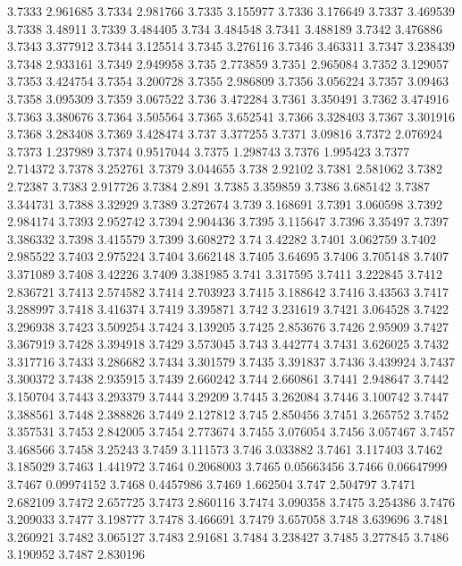 3.7333  2.961685
3.7334  2.981766
3.7335  3.155977
3.7336  3.176649
3.7337  3.469539
3.7338  3.48911
3.7339  3.484405
3.734  3.484548
3.7341  3.488189
3.7342  3.476886
3.7343  3.377912
3.7344  3.125514
3.7345  3.276116
3.7346  3.463311
3.7347  3.238439
3.7348  2.933161
3.7349  2.949958
3.735  2.773859
3.7351  2.965084
3.7352  3.129057
3.7353  3.424754
3.7354  3.200728
3.7355  2.986809
3.7356  3.056224
3.7357  3.09463
3.7358  3.095309
3.7359  3.067522
3.736  3.472284
3.7361  3.350491
3.7362  3.474916
3.7363  3.380676
3.7364  3.505564
3.7365  3.652541
3.7366  3.328403
3.7367  3.301916
3.7368  3.283408
3.7369  3.428474
3.737  3.377255
3.7371  3.09816
3.7372  2.076924
3.7373  1.237989
3.7374  0.9517044
3.7375  1.298743
3.7376  1.995423
3.7377  2.714372
3.7378  3.252761
3.7379  3.044655
3.738  2.92102
3.7381  2.581062
3.7382  2.72387
3.7383  2.917726
3.7384  2.891
3.7385  3.359859
3.7386  3.685142
3.7387  3.344731
3.7388  3.32929
3.7389  3.272674
3.739  3.168691
3.7391  3.060598
3.7392  2.984174
3.7393  2.952742
3.7394  2.904436
3.7395  3.115647
3.7396  3.35497
3.7397  3.386332
3.7398  3.415579
3.7399  3.608272
3.74  3.42282
3.7401  3.062759
3.7402  2.985522
3.7403  2.975224
3.7404  3.662148
3.7405  3.64695
3.7406  3.705148
3.7407  3.371089
3.7408  3.42226
3.7409  3.381985
3.741  3.317595
3.7411  3.222845
3.7412  2.836721
3.7413  2.574582
3.7414  2.703923
3.7415  3.188642
3.7416  3.43563
3.7417  3.288997
3.7418  3.416374
3.7419  3.395871
3.742  3.231619
3.7421  3.064528
3.7422  3.296938
3.7423  3.509254
3.7424  3.139205
3.7425  2.853676
3.7426  2.95909
3.7427  3.367919
3.7428  3.394918
3.7429  3.573045
3.743  3.442774
3.7431  3.626025
3.7432  3.317716
3.7433  3.286682
3.7434  3.301579
3.7435  3.391837
3.7436  3.439924
3.7437  3.300372
3.7438  2.935915
3.7439  2.660242
3.744  2.660861
3.7441  2.948647
3.7442  3.150704
3.7443  3.293379
3.7444  3.29209
3.7445  3.262084
3.7446  3.100742
3.7447  3.388561
3.7448  2.388826
3.7449  2.127812
3.745  2.850456
3.7451  3.265752
3.7452  3.357531
3.7453  2.842005
3.7454  2.773674
3.7455  3.076054
3.7456  3.057467
3.7457  3.468566
3.7458  3.25243
3.7459  3.111573
3.746  3.033882
3.7461  3.117403
3.7462  3.185029
3.7463  1.441972
3.7464  0.2068003
3.7465  0.05663456
3.7466  0.06647999
3.7467  0.09974152
3.7468  0.4457986
3.7469  1.662504
3.747  2.504797
3.7471  2.682109
3.7472  2.657725
3.7473  2.860116
3.7474  3.090358
3.7475  3.254386
3.7476  3.209033
3.7477  3.198777
3.7478  3.466691
3.7479  3.657058
3.748  3.639696
3.7481  3.260921
3.7482  3.065127
3.7483  2.91681
3.7484  3.238427
3.7485  3.277845
3.7486  3.190952
3.7487  2.830196
